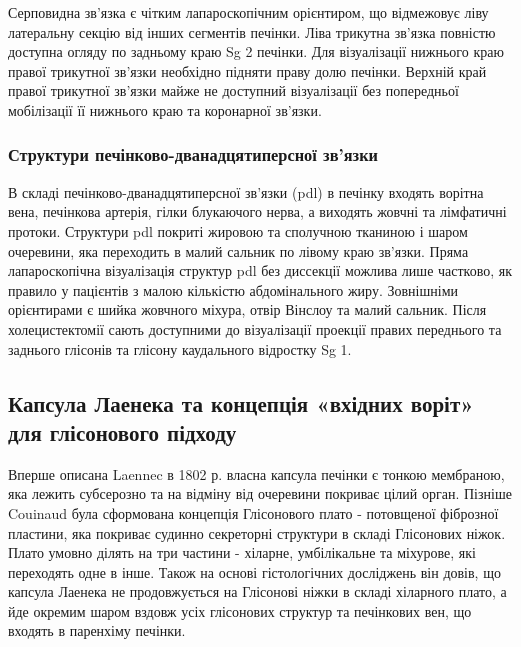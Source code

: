 \begin{refsection}
Серповидна зв'язка є чітким лапароскопічним орієнтиром, що відмежовує ліву латеральну секцію від інших сегментів печінки. Ліва трикутна зв'язка повністю доступна огляду по задньому краю Sg 2 печінки. Для візуалізації нижнього краю правої трикутної зв'язки необхідно підняти праву долю печінки. Верхній край правої трикутної зв'язки майже не доступний візуалізації без попередньої мобілізації її нижнього краю та коронарної зв'язки.

\subsubsection{Структури печінково-дванадцятиперсної зв'язки}

В складі печінково-дванадцятиперсної зв'язки (\acrshort{pdl}) в печінку входять ворітна вена, печінкова артерія, гілки блукаючого нерва, а виходять жовчні та лімфатичні протоки. Структури \acrshort{pdl} покриті жировою та сполучною тканиною і шаром очеревини, яка переходить в малий сальник по лівому краю зв'язки. Пряма лапароскопічна візуалізація структур \acrshort{pdl} без диссекції можлива лише частково, як правило у пацієнтів з малою кількістю абдомінального жиру. Зовнішніми орієнтирами є шийка жовчного міхура, отвір Вінслоу та малий сальник. Після холецистектомії сають доступними до візуалізації проекції правих переднього та заднього глісонів та глісону каудального відростку Sg 1. 
\subsection{Капсула Лаенека та концепція «вхідних воріт» для глісонового підходу}

Вперше описана Laennec в 1802 р. власна капсула печінки є тонкою мембраною, яка лежить субсерозно та на відміну від очеревини покриває цілий орган. Пізніше Couinaud була сформована концепція Глісонового плато - потовщеної фіброзної пластини, яка покриває судинно секреторні структури в складі Глісонових ніжок. Плато умовно ділять на три частини - хіларне, умбілікальне та міхурове, які переходять одне в інше. Також на основі гістологічних досліджень він довів, що капсула Лаенека не продовжується на Глісонові ніжки в складі хіларного плато, а йде окремим шаром вздовж усіх глісонових структур та печінкових вен, що входять в паренхіму печінки.


\end{refsection}
